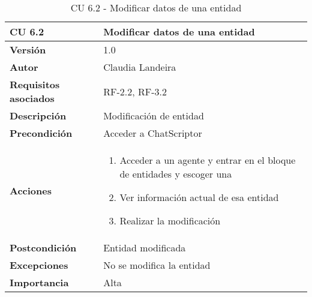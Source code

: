 \begin{table}[p]
	\centering
	\begin{tabularx}{\linewidth}{ p{} p{} }
		\toprule
		\textbf{CU 6.2}    & \textbf{Modificar datos de una entidad}\\
		\toprule
		\textbf{Versión}              & 1.0    \\
		\textbf{Autor}                & Claudia Landeira \\
		\textbf{Requisitos asociados} & RF-2.2, RF-3.2\\
		\textbf{Descripción}          & Modificación de entidad\\
		\textbf{Precondición}         & Acceder a ChatScriptor\\
		\textbf{Acciones}             &
		\begin{enumerate}
			\def\labelenumi{\arabic{enumi}.}
			\tightlist
                \item Acceder a un agente y entrar en el bloque de entidades y escoger una
                \item Ver información actual de esa entidad
                \item Realizar la modificación
		\end{enumerate}\\
		\textbf{Postcondición}        & Entidad modificada  \\
		\textbf{Excepciones}          & No se modifica la entidad \\
		\textbf{Importancia}          & Alta \\
		\bottomrule
	\end{tabularx}
	\caption{CU 6.2 - Modificar datos de una entidad}
\end{table}

